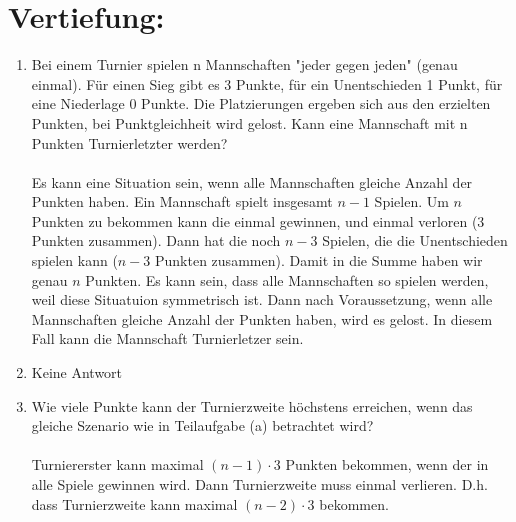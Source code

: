 


\DeclareMathOperator{\ggT}{ggT}
\DeclareMathOperator{\kgV}{kgV}


    \maketitle
    \section*{Vertiefung:}
    \begin{enumerate}[label=(\alph*)]
        \item Bei einem Turnier spielen n Mannschaften "jeder gegen jeden" (genau einmal). Für einen
		Sieg gibt es 3 Punkte, für ein Unentschieden 1 Punkt, für eine Niederlage 0 Punkte. Die
		Platzierungen ergeben sich aus den erzielten Punkten, bei Punktgleichheit wird gelost.
		Kann eine Mannschaft mit n Punkten Turnierletzter werden? \\\\
		Es kann eine Situation sein, wenn alle Mannschaften gleiche Anzahl der Punkten haben. 
		Ein Mannschaft spielt insgesamt $n-1$ Spielen. Um $n$ Punkten zu bekommen kann die einmal 
		gewinnen, und einmal verloren (3 Punkten zusammen). Dann hat die noch $n-3$ Spielen, die die 
		Unentschieden spielen kann ($n-3$ Punkten zusammen). Damit in die Summe haben wir genau $n$ 
		Punkten. Es kann sein, dass alle Mannschaften so spielen werden, weil diese Situatuion
		symmetrisch ist. Dann nach Voraussetzung, wenn alle Mannschaften gleiche Anzahl der Punkten 
		haben, wird es gelost. In diesem Fall kann die Mannschaft Turnierletzer sein.
		
        \item Keine Antwort
        
        \item Wie viele Punkte kann der Turnierzweite höchstens erreichen, wenn das gleiche Szenario
		wie in Teilaufgabe (a) betrachtet wird? \\\\
		Turniererster kann maximal $(n-1)\cdot 3$ Punkten bekommen, wenn der in alle Spiele gewinnen 
		wird. Dann Turnierzweite muss einmal verlieren. D.h. dass Turnierzweite kann maximal 
		$(n-2)\cdot 3$ bekommen.
        

\end{enumerate}
